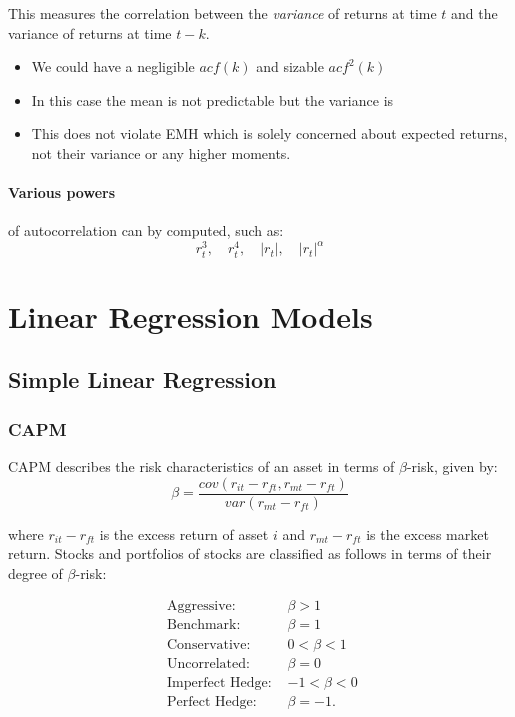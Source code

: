 \documentclass[11pt]{article}
\begin{document}
This measures the correlation between the \textit{variance} of returns at time $t$ and the variance of returns at time $t-k$. 
\begin{itemize}
    \item We could have a negligible $acf(k)$ and sizable $acf^2(k)$
    \item In this case the mean is not predictable but the variance is
    \item This does not violate EMH which is solely concerned about expected returns, not their variance or any higher moments.
\end{itemize}

\paragraph{Various powers} of autocorrelation can by computed, such as:
\[r_t^3, \quad r_t^4, \quad |r_t|, \quad |r_t|^\alpha\]

\section{Linear Regression Models}

\subsection{Simple Linear Regression}

\subsubsection{CAPM}
CAPM describes the risk characteristics of an asset in terms of $\beta$-risk, given by:
\[\beta = \dfrac{cov(r_{it} - r_{ft},r_{mt}-r_{ft})}{var(r_{mt}-r_{ft})}\]

where $r_{it} - r_{ft}$ is the excess return of asset $i$ and $r_{mt}-r_{ft}$ is the excess market return. Stocks and portfolios of stocks are classified as follows in terms of their degree of $\beta$-risk:

\begin{equation}
\begin{array}{lc}
\text { Aggressive: } & \beta>1 \\
\text { Benchmark: } & \beta=1 \\
\text { Conservative: } & 0<\beta<1 \\
\text { Uncorrelated: } & \beta=0 \\
\text { Imperfect Hedge: } & -1<\beta<0 \\
\text { Perfect Hedge: } & \beta=-1 .
\end{array}
\end{equation}
\end{document}

